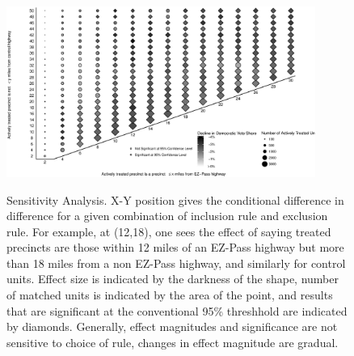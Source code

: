 
\begin{figure}[t]
    \centering
    \includegraphics[width=0.9\textwidth]{Figures/new_style_04.eps}
    \label{fig:heatmap}
    \caption{Sensitivity Analysis. X-Y position gives the conditional difference in difference for a given combination of inclusion rule and exclusion rule. For example, at (12,18), one sees the effect of saying treated precincts are those within 12 miles of an EZ-Pass highway but more than 18 miles from a non EZ-Pass highway, and similarly for control units. Effect size is indicated by the darkness of the shape, number of matched units is indicated by the area of the point, and results that are significant at the conventional 95\% threshhold are indicated by diamonds. Generally, effect magnitudes and significance are not sensitive to choice of rule, changes in effect magnitude are gradual.}
\end{figure}